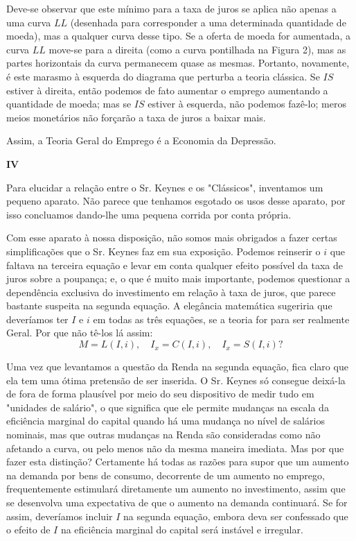 \documentclass[12pt]{article}
\begin{document}
Deve-se observar que este mínimo para a taxa de juros se aplica não apenas a uma curva $LL$ (desenhada para corresponder a uma determinada quantidade de moeda), mas a qualquer curva desse tipo. Se a oferta de moeda for aumentada, a curva $LL$ move-se para a direita (como a curva pontilhada na Figura 2), mas as partes horizontais da curva permanecem quase as mesmas. Portanto, novamente, é este marasmo à esquerda do diagrama que perturba a teoria clássica. Se $IS$ estiver à direita, então podemos de fato aumentar o emprego aumentando a quantidade de moeda; mas se $IS$ estiver à esquerda, não podemos fazê-lo; meros meios monetários não forçarão a taxa de juros a baixar mais.

Assim, a Teoria Geral do Emprego é a Economia da Depressão.

\begin{center}
\textbf{IV}
\end{center}

Para elucidar a relação entre o Sr. Keynes e os "Clássicos", inventamos um pequeno aparato. Não parece que tenhamos esgotado os usos desse aparato, por isso concluamos dando-lhe uma pequena corrida por conta própria.

Com esse aparato à nossa disposição, não somos mais obrigados a fazer certas simplificações que o Sr. Keynes faz em sua exposição. Podemos reinserir o $i$ que faltava na terceira equação e levar em conta qualquer efeito possível da taxa de juros sobre a poupança; e, o que é muito mais importante, podemos questionar a dependência exclusiva do investimento em relação à taxa de juros, que parece bastante suspeita na segunda equação. A elegância matemática sugeriria que deveríamos ter $I$ e $i$ em todas as três equações, se a teoria for para ser realmente Geral. Por que não tê-los lá assim:
\[ M = L(I, i), \quad I_x = C(I, i), \quad I_x = S(I, i)? \]

Uma vez que levantamos a questão da Renda na segunda equação, fica claro que ela tem uma ótima pretensão de ser inserida. O Sr. Keynes só consegue deixá-la de fora de forma plausível por meio do seu dispositivo de medir tudo em "unidades de salário", o que significa que ele permite mudanças na escala da eficiência marginal do capital quando há uma mudança no nível de salários nominais, mas que outras mudanças na Renda são consideradas como não afetando a curva, ou pelo menos não da mesma maneira imediata. Mas por que fazer esta distinção? Certamente há todas as razões para supor que um aumento na demanda por bens de consumo, decorrente de um aumento no emprego, frequentemente estimulará diretamente um aumento no investimento, assim que se desenvolva uma expectativa de que o aumento na demanda continuará. Se for assim, deveríamos incluir $I$ na segunda equação, embora deva ser confessado que o efeito de $I$ na eficiência marginal do capital será instável e irregular.
\end{document}
